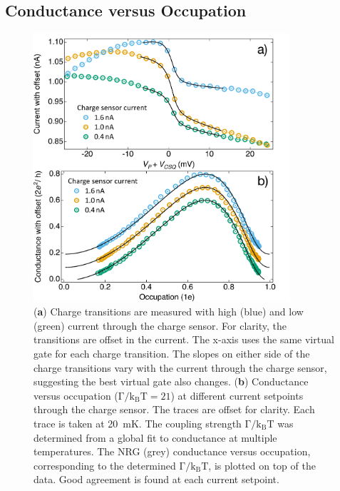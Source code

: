 \subsection{Conductance versus Occupation}



\begin{figure}[!hbt]
 \begin{center}
 \includegraphics[width=0.85\textwidth]{figures/ch3/figure17.pdf}
 \caption[Conductance versus Occupation : Varying Charge Sensor Current]{\label{fig:ch3/cond_occ_QPC_vs_ct}  
 (\textbf{a}) Charge transitions are measured with high (blue) and low (green) current through the charge sensor. For clarity, the transitions are offset in the current. The x-axis uses the same virtual gate for each charge transition. The slopes on either side of the charge transitions vary with the current through the charge sensor, suggesting the best virtual gate also changes. (\textbf{b}) Conductance versus occupation ($\mathrm{\Gamma/k_BT=21}$) at different current setpoints through the charge sensor. The traces are offset for clarity. Each trace is taken at \qty{20}{mK}. The coupling strength $\mathrm{\Gamma/k_BT}$ was determined from a global fit to conductance at multiple temperatures. The NRG (grey) conductance versus occupation, corresponding to the determined $\mathrm{\Gamma/k_BT}$, is plotted on top of the data. Good agreement is found at each current setpoint.}
 \end{center}
\end{figure}


